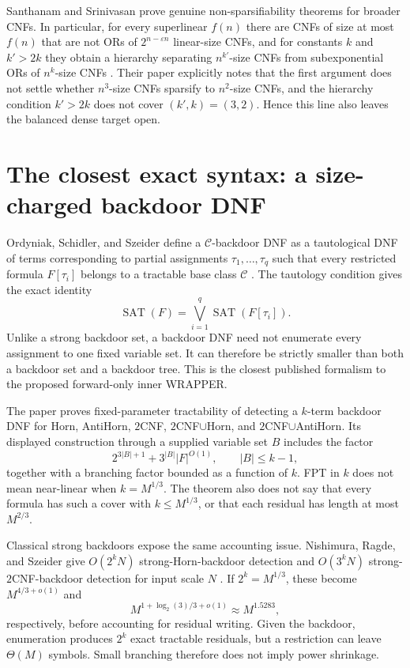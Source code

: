 \documentclass[11pt]{article}
\newcommand{\SAT}{\operatorname{SAT}}
\begin{document}
Santhanam and Srinivasan prove genuine non-sparsifiability theorems for
broader CNFs.  In particular, for every superlinear $f(n)$ there are CNFs of
size at most $f(n)$ that are not ORs of $2^{n-\varepsilon n}$ linear-size
CNFs, and for constants $k$ and $k'>2k$ they obtain a hierarchy separating
$n^{k'}$-size CNFs from subexponential ORs of $n^k$-size CNFs
\cite{santhanamsrinivasan2011}.  Their paper explicitly notes that the first
argument does not settle whether $n^3$-size CNFs sparsify to $n^2$-size
CNFs, and the hierarchy condition $k'>2k$ does not cover $(k',k)=(3,2)$.
Hence this line also leaves the balanced dense target open.

\section{The closest exact syntax: a size-charged backdoor DNF}

Ordyniak, Schidler, and Szeider define a $\mathcal C$-backdoor DNF as a
tautological DNF of terms corresponding to partial assignments
$\tau_1,\ldots,\tau_q$ such that every restricted formula $F[\tau_i]$
belongs to a tractable base class $\mathcal C$
\cite{ordyniakschidlerszeider2021}.  The tautology condition gives the exact
identity
\begin{equation}
 \SAT(F)=\bigvee_{i=1}^{q}\SAT(F[\tau_i]). \tag{8}
\end{equation}
Unlike a strong backdoor set, a backdoor DNF need not enumerate every
assignment to one fixed variable set.  It can therefore be strictly smaller
than both a backdoor set and a backdoor tree.  This is the closest published
formalism to the proposed forward-only inner WRAPPER.

The paper proves fixed-parameter tractability of detecting a $k$-term
backdoor DNF for Horn, AntiHorn, $2$CNF, $2$CNF$\cup$Horn, and
$2$CNF$\cup$AntiHorn.  Its displayed construction through a supplied
variable set $B$ includes the factor
\begin{equation}
 2^{3|B|+1}+3^{|B|}|F|^{O(1)}, \qquad |B|\le k-1, \tag{9}
\end{equation}
together with a branching factor bounded as a function of $k$.  FPT in $k$
does not mean near-linear when $k=M^{1/3}$.  The theorem also does not say
that every formula has such a cover with $k\le M^{1/3}$, or that each
residual has length at most $M^{2/3}$.

Classical strong backdoors expose the same accounting issue.  Nishimura,
Ragde, and Szeider give $O(2^kN)$ strong-Horn-backdoor detection and
$O(3^kN)$ strong-$2$CNF-backdoor detection for input scale $N$
\cite{nishimuraragdeszeider2004}.  If $2^k=M^{1/3}$, these become
$M^{4/3+o(1)}$ and
\[
 M^{1+\log_2(3)/3+o(1)}\approx M^{1.5283}, \tag{10}
\]
respectively, before accounting for residual writing.  Given the backdoor,
enumeration produces $2^k$ exact tractable residuals, but a restriction can
leave $\Theta(M)$ symbols.  Small branching therefore does not imply power
shrinkage.
\end{document}
